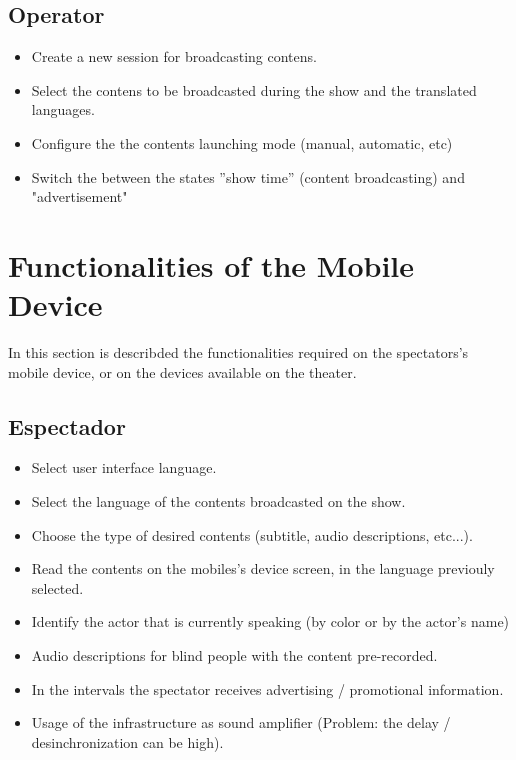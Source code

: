 \documentclass[10pt, oneside, a4paper]{article}
\begin{document}
\subsection{Operator}
\begin{itemize}
	\item Create a new session for broadcasting contens.
	\item Select the contens to be broadcasted during the show and the translated languages.
	\item Configure the the contents launching mode (manual, automatic, etc)
	\item Switch the between the states ''show time'' (content broadcasting) and "advertisement"
\end{itemize}

\section{Functionalities of the Mobile Device}
In this section is describded the functionalities required on the spectators's mobile device, or on the devices available on the theater.

\subsection{Espectador}
\begin{itemize}
	\item Select user interface language.
	\item Select the language of the contents broadcasted on the show.
	\item Choose the type of desired contents (subtitle, audio descriptions, etc...).
	\item Read the contents on the mobiles's device screen, in the language previouly selected.
	\item Identify the actor that is currently speaking (by color or by the actor's name) 
	\item Audio descriptions for blind people with the content pre-recorded. 
	\item In the intervals the spectator receives advertising / promotional information.
	\item Usage of the infrastructure as sound amplifier (Problem: the delay / desinchronization can be high).
\end{itemize}
\end{document}
